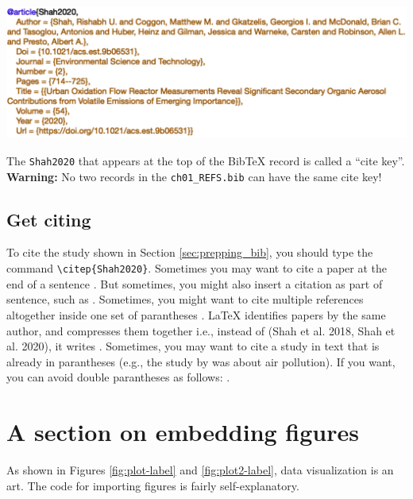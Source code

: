 \begin{center}
\includegraphics[width=\linewidth]{"ch01/bib_example"}
\end{center}

The \verb|Shah2020| that appears at the top of the BibTeX record is called a ``cite key''.
\textbf{Warning:} No two records in the \verb|ch01_REFS.bib| can have the same cite key!

\subsection{Get citing}
To cite the study shown in Section \ref{sec:prepping_bib}, you should type the command \verb|\citep{Shah2020}|. Sometimes you may want to cite a paper at the end of a sentence \citep{Shah2020}. But sometimes, you might also insert a citation as part of sentence, such as \citet{Shah2020}. Sometimes, you might want to cite multiple references altogether inside one set of parantheses \citep{Shah2018,Shah2020,Robinson2019}. \LaTeX{} identifies papers by the same author, and compresses them together i.e., instead of (Shah et al. 2018, Shah et al. 2020), it writes \citep{Shah2018,Shah2020}. Sometimes, you may want to cite a study in text that is already in parantheses (e.g., the study by \citep{Shah2018} was about air pollution). If you want, you can avoid double parantheses as follows: \cite[e.g., the study by][was about air pollution]{Shah2018}.

\section{A section on embedding figures}\label{figures-sec}
As shown in Figures \ref{fig:plot-label} and \ref{fig:plot2-label}, data visualization is an art. The code for importing figures is fairly self-explanatory.

